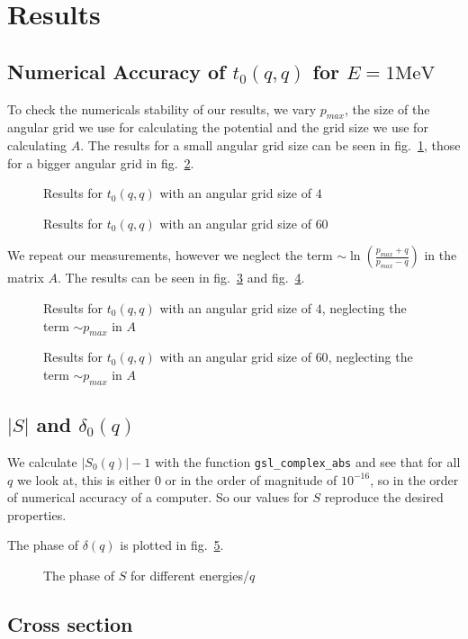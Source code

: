\documentclass{scrartcl}
\begin{document}

\section{Results}
\subsection{Numerical Accuracy of $t_0(q,q)$ for $E=1\si{\mega\electronvolt}$}

To check the numericals stability of our results, we vary $p_{max}$, the size of the angular grid we use for calculating the potential and the grid size we use for calculating $A$. The results for a small angular grid size can be seen in fig.~\ref{fig:tnnsmallangsize}, those for a bigger angular grid in fig.~\ref{fig:tnnbigangsize}.

\begin{figure}[htbp]
	
	\caption{Results for $t_0(q,q)$ with an angular grid size of $4$}
	\label{fig:tnnsmallangsize}
\end{figure}

\begin{figure}[htbp]
	
	\caption{Results for $t_0(q,q)$ with an angular grid size of $60$}
	\label{fig:tnnbigangsize}
\end{figure}

We repeat our measurements, however we neglect the term $\sim \ln\left(\frac{p_{max}+q}{p_{max}-q}\right)$ in the matrix $A$. The results can be seen in fig.~\ref{fig:tnnsmallangsizewopm} and fig.~\ref{fig:tnnbigangsizewopm}. 

\begin{figure}[htbp]
	
	\caption{Results for $t_0(q,q)$ with an angular grid size of $4$, neglecting the term $\sim p_{max}$ in $A$}
	\label{fig:tnnsmallangsizewopm}
\end{figure}

\begin{figure}[htbp]
	
	\caption{Results for $t_0(q,q)$ with an angular grid size of $60$, neglecting the term $\sim p_{max}$ in $A$}
	\label{fig:tnnbigangsizewopm}
\end{figure}

\subsection{$|S|$ and $\delta_0(q)$}
We calculate $|S_0(q)|-1$ with the function \texttt{gsl\_complex\_abs} and see that for all $q$ we look at, this is either 0 or in the order of magnitude of $10^{-16}$, so in the order of numerical accuracy of a computer. So our values for $S$ reproduce the desired properties. 

The phase of $\delta(q)$ is plotted in fig.~\ref{fig:delta}.

\begin{figure}[htbp]
	
	\caption{The phase of $S$ for different energies/$q$}
	\label{fig:delta}
\end{figure}

\subsection{Cross section}

\newpage
\listoffigures
\listoftables
\printbibliography
\end{document}
